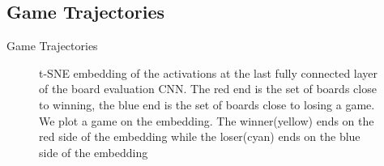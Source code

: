 \documentclass[9pt, unknownkeysallowed]{beamer}
\begin{document}
\subsection{Game Trajectories}
\begin{frame}{Game Trajectories}
\begin{figure}[H]
 \caption[Game Trajectories]{t-SNE embedding of the activations at the last 
fully connected layer of the board evaluation CNN. The red end is the set of 
boards close to winning, the blue end is the set of boards close to losing 
a game. We plot a game on the embedding. The winner(yellow) ends on the red 
side of the embedding while the loser(cyan) ends on the blue side of the 
embedding}
\end{figure}
\end{frame}
\end{document}
